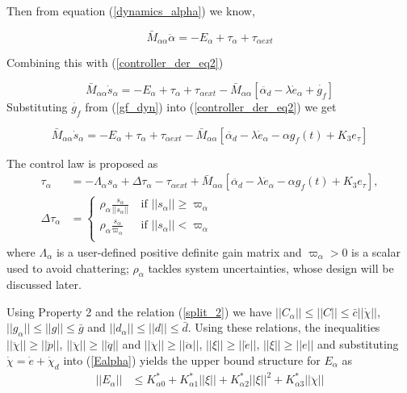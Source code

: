 \documentclass[letterpaper, 10 pt, conference]{ieeeconf}  %
\begin{document}
Then from equation (\ref{dynamics_alpha}) we know,

\begin{equation} \label{}
\bar{M}_{\alpha\alpha}\ddot{{\alpha}} = - E_{\alpha} + \tau_{\alpha}   + \tau_{\alpha{ext}}       
\end{equation}

Combining this with (\ref{controller_der_eq2})

\begin{equation}
    \bar{M}_{\alpha\alpha} \dot s_\alpha = - E_{\alpha} + \tau_{\alpha}   + \tau_{\alpha{ext}}  - \bar{M}_{\alpha \alpha} [\ddot{\alpha_d} - \lambda {\dot e_\alpha} + \dot {g_f}]
\end{equation} 
Substituting $\dot{g_f}$ from (\ref{gf_dyn}) into (\ref{controller_der_eq2}) we get

\begin{equation}
    \bar{M}_{\alpha\alpha} \dot s_\alpha = - E_{\alpha} + \tau_{\alpha}   + \tau_{\alpha{ext}}  - \bar{M}_{\alpha \alpha} [\ddot{\alpha_d} - \lambda {\dot e_\alpha} - \alpha g_f(t) + K_3 e_{\tau}]
\end{equation} 


The control law is proposed as
\begin{subequations}\label{ct3}
\begin{align}
\tau_{\alpha} &= -\Lambda_{\alpha} s_\alpha + \Delta \tau_{\alpha} - \tau_{\alpha{ext}} + \bar{M}_{\alpha \alpha} [\ddot{\alpha_d} - \lambda {\dot e_\alpha} - \alpha g_f(t) + K_3 e_{\tau}],  \label{tau_alpha}\\
\Delta \tau_{\alpha} &= \begin{cases}
    \rho_{\alpha} \frac{s_{\alpha}}{||s_{\alpha}||}       & ~ \text{if } || s_{\alpha}|| \geq \varpi_\alpha\\
    \label{del_alpha}
    \rho_{\alpha} \frac{s_{\alpha}}{\varpi_\alpha}       & ~ \text{if } || s_{\alpha}|| < \varpi_\alpha\\
    \end{cases}
\end{align}
\end{subequations}
where $\Lambda_{\alpha}$ is a user-defined positive definite gain matrix and $\varpi_{\alpha} > 0$ is a scalar used to avoid chattering; $\rho_{\alpha}$ tackles system uncertainties, whose design will be discussed later.

 
Using Property 2 and the relation (\ref{split_2}) we have $||C_{\alpha}|| \leq ||C|| \leq \bar{c}||\dot{\chi}||$, $||g_{\alpha}|| \leq ||g|| \leq \bar{g}$ and $||d_{\alpha}|| \leq ||d|| \leq \bar{d}$. Using these relations, the inequalities $||\ddot{\chi}|| \geq ||\ddot{p}||$, $||\ddot{\chi}|| \geq ||\ddot{q}||$ and $||\ddot{\chi}|| \geq ||\ddot{\alpha}||$, $||\xi|| \geq ||\dot{e}||$, $||\xi|| \geq ||{e}||$ and substituting $\dot{\chi} = \dot{e} + \dot{\chi}_d$ into (\ref{Ealpha}) yields the upper bound structure for $E_\alpha$ as
\begin{align} 
||E_{\alpha}|| &\leq K_{\alpha0}^*  +K_{\alpha1}^*||\xi||+ K_{\alpha2}^*||\xi||^2 + K_{\alpha3}^*||\ddot{\chi}||\label{up_bound_alpha} 
\end{align}
\end{document}
